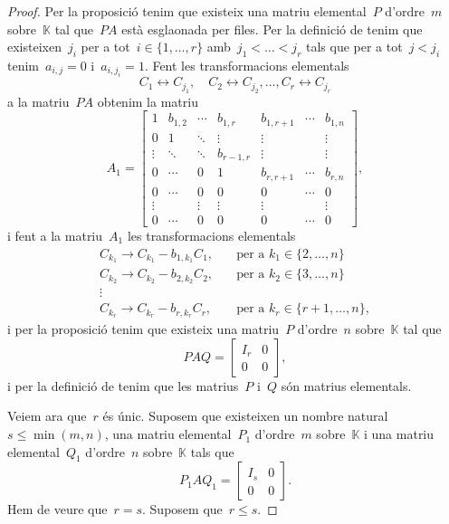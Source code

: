 \documentclass[../../Main.tex]{subfiles}
\begin{document}
\begin{theorem}
\begin{proof}
			Per la proposició  tenim que existeix una matriu elemental~\(P\) d'ordre~\(m\) sobre~\(\mathbb{K}\) tal que~\(PA\) està esglaonada per files.
			Per la definició de  tenim que existeixen~\(j_{i}\) per a tot~\(i\in\{1,\dots,r\}\) amb~\(j_{1}<\dots<j_{r}\) tals que per a tot~\(j<j_{i}\) tenim~\(a_{i,j}=0\) i~\(a_{i,j_{i}}=1\).
			Fent les transformacions elementals
			\[
			    C_{1}\leftrightarrow C_{j_{1}},\quad C_{2}\leftrightarrow C_{j_{2}},\dots,C_{r}\leftrightarrow C_{j_{r}}
			\]
			a la matriu~\(PA\) obtenim la matriu
			\[A_{1}=\left[\begin{array}{cccc|ccc}
			1 & b_{1,2} & \cdots & b_{1,r} & b_{1,r+1} & \cdots & b_{1,n} \\
			0 & 1 & \ddots & \vdots & \vdots & & \vdots\\
			\vdots & \ddots & \ddots & b_{r-1,r} & \vdots & & \vdots \\
			0 & \cdots & 0 & 1 & b_{r,r+1} & \cdots & b_{r,n} \\\hline
			0 & \cdots & 0 & 0 & 0 & \cdots & 0 \\
			\vdots & & \vdots & \vdots & \vdots & & \vdots \\
			0 & \cdots & 0 & 0 & 0 & \cdots & 0
			\end{array}\right],\]
			i fent a la matriu~\(A_{1}\) les transformacions elementals
			\begin{align*}
			C_{k_{1}}\rightarrow C_{k_{1}}-b_{1,k_{1}}C_{1},\quad&\text{per a }k_{1}\in\{2,\dots,n\} \\
			C_{k_{2}}\rightarrow C_{k_{2}}-b_{2,k_{2}}C_{2},\quad&\text{per a }k_{2}\in\{3,\dots,n\} \\
			\vdots & \\
			C_{k_{r}}\rightarrow C_{k_{r}}-b_{r,k_{r}}C_{r},\quad&\text{per a }k_{r}\in\{r+1,\dots,n\},
			\end{align*}
			i per la proposició  tenim que existeix una matriu~\(P\) d'ordre~\(n\) sobre~\(\mathbb{K}\) tal que
			\[PAQ=\left[\begin{array}{c|c}
			I_{r} & 0\\\hline
			0 & 0
			\end{array}\right],\]
			i per la definició de  tenim que les matrius~\(P\) i~\(Q\) són matrius elementals.

			Veiem ara que~\(r\) és únic.
			Suposem que existeixen un nombre natural~\(s\leq\min(m,n)\), una matriu elemental~\(P_{1}\) d'ordre~\(m\) sobre~\(\mathbb{K}\) i una matriu elemental~\(Q_{1}\) d'ordre~\(n\) sobre~\(\mathbb{K}\) tals que
			\[P_{1}AQ_{1}=\left[\begin{array}{c|c}
			I_{s} & 0\\\hline
			0 & 0
			\end{array}\right].\]
			Hem de veure que~\(r=s\).
			Suposem que~\(r\leq s\).


\end{proof}
\end{theorem}
\end{document}

